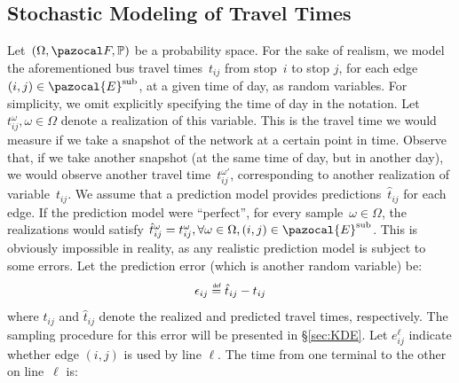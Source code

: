 \documentclass[a4paper,fleqn]{cas-sc}
\newcommand{\defeq}{\stackrel{\scalebox{0.5}{\ensuremath{\mathsf{\,def}}}}{=}}
\begin{document}
\subsection{Stochastic Modeling of Travel Times}
\label{sec:Stochastic-Modeling-of-Travel-Times}
Let~$(\Omega,\pazocal F,\mathbb P)$ be a probability space. 
For the sake of realism, we model the aforementioned bus travel times~$t_{ij}$ from stop~$i$ to stop $j$, for each edge $(i,j)\in\pazocal{E}^{\text{sub}}$, at a given time of day, as random variables. For simplicity, we omit explicitly specifying the time of day in the notation. Let~$t_{ij}^\omega, \omega\in\Omega$ denote a realization of this variable. 
%
This is the travel time we would measure if we take a snapshot of the network at a certain point in time. Observe that, if we take another snapshot (at the same time of day, but in another day), we would observe another travel time~$t_{ij}^{\omega'}$, corresponding to another realization of variable~$t_{ij}$.
We assume that a prediction model provides predictions~$\hat t_{ij}$ for each edge.
%
If the prediction model were ``perfect'', for every sample~$\omega\in\Omega$, the realizations would satisfy $\hat t_{ij}^\omega = t_{ij}^\omega, \forall \omega\in\Omega,(i,j)\in\pazocal{E}^{\text{sub}}$. This is obviously impossible in reality, as any realistic prediction model is subject to some errors. Let the prediction error (which is another random variable) be:
%
\begin{equation}
\epsilon_{ij} \defeq \hat t_{ij}-t_{ij}\label{eq:link_time_error}
\end{equation}
%
where $t_{ij}$ and $\hat t_{ij}$ denote the realized and predicted travel times, respectively. The sampling procedure for this error will be presented in \S{}\ref{sec:KDE}.
%
Let $e_{ij}^\ell$ indicate whether edge $(i,j)$ is used by line $\ell$. 
%
The time from one terminal to the other on line~$\ell$ is: 
\end{document}
